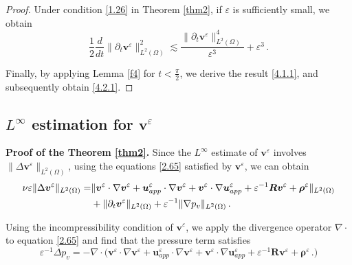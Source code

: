 \documentclass[pdflatex,sn-mathphys-num]{sn-jnl}%
\theoremstyle{thmstyleone}%
\theoremstyle{thmstyletwo}%
\theoremstyle{thmstylethree}%
\theoremstyle{thmstyletwo}
\begin{document}
\begin{proof}
	
	Under condition  \eqref{1.26} in Theorem \ref{thm2}, if $\varepsilon$ is sufficiently small, we obtain 
	\begin{equation}
		\label{4.20.2}
		\frac{1}{2}\frac{d}{dt}\lVert\partial_t\boldsymbol v^{\varepsilon}\rVert^2_{{L}^2(\Omega)}
		\lesssim
		\frac{
			\lVert
			\partial_t{\boldsymbol v}^{\varepsilon} 	\rVert^{4}_{{L}^2(\Omega)}
		}{
			\varepsilon^3
		}
		+\varepsilon^3\,.
	\end{equation}
	
	Finally, by applying Lemma \ref{f4} for $t< \frac\pi2$, we derive the result \eqref{4.1.1}, and subsequently obtain \eqref{4.2.1}.
\end{proof}





\subsection{$L^\infty$ estimation for $\boldsymbol{v}^\varepsilon$}\label{sub4.3}


\textbf{Proof of the Theorem \ref{thm2}.}
Since the $L^\infty$ estimate of \( \boldsymbol{v}^\varepsilon \) involves $\lVert \Delta\boldsymbol{v}^\varepsilon\rVert_{{L}^{2}(\Omega)}$, using the equations \eqref{2.65} satisfied by $\boldsymbol{v}^\varepsilon$, we can obtain
\begin{align}\label{3.3.1.1}
	\nu\varepsilon
	\lVert\Delta{\boldsymbol v}^{\varepsilon}\rVert_{{L}^{2}(\Omega)}
	=&
	\lVert
	{\boldsymbol v}^{\varepsilon} \cdot \nabla {\boldsymbol v}^{\varepsilon}
	+
	{\boldsymbol u}_{app}^{\varepsilon} \cdot \nabla {\boldsymbol v}^{\varepsilon}
	+
	{\boldsymbol v}^{\varepsilon} \cdot \nabla\boldsymbol{u}^\varepsilon_{app}
	+
	{\varepsilon}^{-1}\boldsymbol{R}\boldsymbol v^{\varepsilon}
	+\boldsymbol \rho^{\varepsilon}
	\rVert_{{L}^{2}(\Omega)}\notag
	\\
	&+\lVert
	\partial_{t} {\boldsymbol v}^{\varepsilon}
	\rVert_{{L}^{2}(\Omega)}+
	{\varepsilon}^{-1}\lVert
	\nabla p_v
	\rVert_{{L}^{2}(\Omega)}
	\,.
\end{align}



Using the incompressibility condition of \( \boldsymbol{v}^\varepsilon \), we apply the divergence operator \( \nabla\cdot \) to equation \eqref{2.65} and find that the pressure term satisfies
\begin{equation}\label{3.3.2}
	\varepsilon^{-1}\Delta p_v
	=-\nabla\cdot
	\big(
	{\boldsymbol v}^{\varepsilon} \cdot \nabla {\boldsymbol v}^{\varepsilon}
	+
	{\boldsymbol u}_{app}^{\varepsilon} \cdot \nabla {\boldsymbol v}^{\varepsilon}
	+
	{\boldsymbol v}^{\varepsilon} \cdot \nabla\boldsymbol{u}^\varepsilon_{app}
	+
	{\varepsilon}^{-1}\boldsymbol{R}\boldsymbol v^{\varepsilon}
	+\boldsymbol \rho^{\varepsilon}\,.
	\big)
\end{equation}
\end{document}
